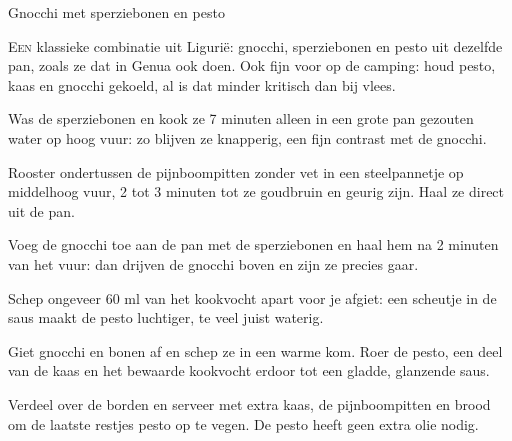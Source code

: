 \begin{recipe}{Gnocchi met sperziebonen en pesto}


\lettrine{E}{en} klassieke combinatie uit Ligurië: gnocchi, sperziebonen en
pesto uit dezelfde pan, zoals ze dat in Genua ook doen. Ook fijn voor op de
camping: houd pesto, kaas en gnocchi gekoeld, al is dat minder kritisch dan
bij vlees.

\begin{ingredients}
\end{ingredients}

\begin{steps}
  \item Was de sperziebonen en kook ze 7 minuten alleen in een grote pan
        gezouten water op hoog vuur: zo blijven ze knapperig, een fijn
        contrast met de gnocchi.
  \item Rooster ondertussen de pijnboompitten zonder vet in een steelpannetje
        op middelhoog vuur, 2 tot 3 minuten tot ze goudbruin en geurig zijn.
        Haal ze direct uit de pan.
  \item Voeg de gnocchi toe aan de pan met de sperziebonen en haal hem na 2
        minuten van het vuur: dan drijven de gnocchi boven en zijn ze precies
        gaar.
  \item Schep ongeveer 60 ml van het kookvocht apart voor je afgiet: een
        scheutje in de saus maakt de pesto luchtiger, te veel juist waterig.
  \item Giet gnocchi en bonen af en schep ze in een warme kom. Roer de
        pesto, een deel van de kaas en het bewaarde kookvocht erdoor tot een
        gladde, glanzende saus.
  \item Verdeel over de borden en serveer met extra kaas, de pijnboompitten
        en brood om de laatste restjes pesto op te vegen. De pesto heeft
        geen extra olie nodig.
\end{steps}
\end{recipe}
